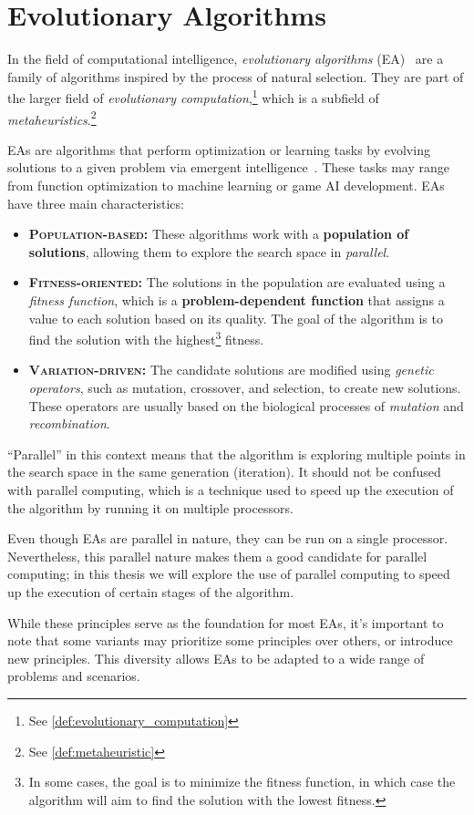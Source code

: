 \section{Evolutionary Algorithms}
\label{sec:evolutionary_algorithms}
  In the field of computational intelligence, \emph{evolutionary algorithms}
  (EA)~\autocite{yuIntroductionEvolutionaryAlgorithms2010} are a family of
  algorithms inspired by the process of natural selection.
  They are part of the larger field of \textit{evolutionary 
  computation},\footnote{See \vref{def:evolutionary_computation}} which is a 
  subfield of \textit{metaheuristics}.\footnote{See \vref{def:metaheuristic}}

  EAs are algorithms that perform optimization or learning tasks by evolving
  solutions to a given problem via emergent 
  intelligence~\autocite{peterj.angelineGeneticProgrammingEmergent1994}.
  These tasks may range from function optimization to machine learning or game
  AI development.
  EAs have three main characteristics:

  \begin{itemize}
    \item \textbf{\textsc{Population-based:}} These algorithms work with a 
      \textbf{population of solutions}, allowing them to explore the search 
      space in \textit{parallel}.
    \item \textbf{\textsc{Fitness-oriented}:} The solutions in the population 
      are evaluated using a \emph{fitness function}, which is a 
      \textbf{problem-dependent function} that assigns a value to each solution 
      based on its quality.
      The goal of the algorithm is to find the solution with the 
      highest\footnote{
        In some cases, the goal is to minimize the fitness function, in which 
        case the algorithm will aim to find the solution with the lowest
        fitness.
      } fitness.
    \item \textbf{\textsc{Variation-driven}:} The candidate solutions are 
      modified using \emph{genetic operators}, such as mutation, crossover, and 
      selection, to create new solutions.
      These operators are usually based on the biological processes of 
      \textit{mutation} and \textit{recombination}.
  \end{itemize}
  
  \begin{remark}
    \enquote{Parallel} in this context means that the algorithm is exploring 
    multiple points in the search space in the same generation (iteration).
    It should not be confused with parallel computing, which is a technique
    used to speed up the execution of the algorithm by running it on multiple
    processors.

    Even though EAs are parallel in nature, they can be run on a single
    processor.
    Nevertheless, this parallel nature makes them a good candidate for
    parallel computing; in this thesis we will explore the use of parallel
    computing to speed up the execution of certain stages of the algorithm.
  \end{remark}

  While these principles serve as the foundation for most EAs, it's important to 
  note that some variants may prioritize some principles over others, or 
  introduce new principles. 
  This diversity allows EAs to be adapted to a wide range of problems and 
  scenarios.
